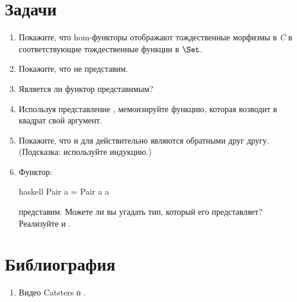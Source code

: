\section{Задачи}

\begin{enumerate}
  \tightlist
  \item
        Покажите, что hom-функторы отображают тождественные морфизмы в \emph{C} в
        соответствующие тождественные функции в $\Set$.
  \item
        Покажите, что  не представим.
  \item
        Является ли функтор  представимым?
  \item
        Используя представление , мемоизируйте функцию, которая возводит в квадрат
        свой аргумент.
  \item
        Покажите, что  и  для 
        действительно являются обратными друг другу. (Подсказка: используйте индукцию.)
  \item
        Функтор:

        \begin{snip}{haskell}
Pair a = Pair a a
\end{snip}
        представим. Можете ли вы угадать тип, который его представляет? Реализуйте
         и .
\end{enumerate}

\section{Библиография}

\begin{enumerate}
  \tightlist
  \item
        Видео Catsters о
        .
\end{enumerate}
